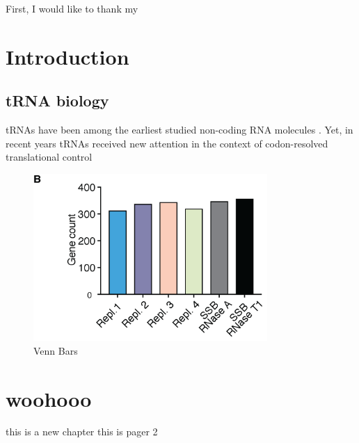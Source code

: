 \documentclass[12pt]{rockefeller}
\begin{document}
First, I would like to thank my  

\renewcommand\contentsname{Table of Contents}
\tableofcontents
\cleardoublepage
{}
{}
\listoffigures
\cleardoublepage
{}
{}
\listoftables

\printglossary[type=\acronymtype,nonumberlist,title={List of Abbreviations}]

\mainmatter
\pagestyle{fancy}
\fancyhf{}
\lhead{\chaptername\ \thechapter}
\rhead{\thesection}
\rfoot{\thepage}

\chapter{Introduction}
\section{tRNA biology}
tRNAs have been among the earliest studied non-coding RNA molecules \cite{Woese:1967, Soll:1995}. Yet, in recent years tRNAs received new attention in the context of codon-resolved translational control 

\begin{figure}[!ht]%
\centering
\includegraphics[width=3.5in]{venn_bars.png}%
\caption{Venn Bars}%
\label{fVenn}%
\end{figure}

\newpage

\cite{Arimbasseri:2016ey, Soll:1995}
\chapter{woohooo}
this is a new chapter\newpage
this is pager 2

\newpage
\renewcommand{\bibname}{References}


{} %
\end{document}
